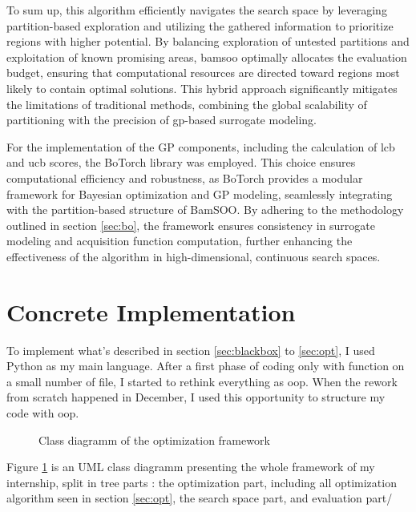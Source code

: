To sum up, this algorithm efficiently navigates the search space by leveraging partition-based exploration and utilizing the gathered information to prioritize regions with higher potential. By balancing exploration of untested partitions and exploitation of known promising areas, \acrshort{bamsoo} optimally allocates the evaluation budget, ensuring that computational resources are directed toward regions most likely to contain optimal solutions. This hybrid approach significantly mitigates the limitations of traditional methods, combining the global scalability of partitioning with the precision of \acrshort{gp}-based surrogate modeling.

For the implementation of the GP components, including the calculation of \acrshort{lcb} and \acrshort{ucb} scores, the BoTorch library was employed. This choice ensures computational efficiency and robustness, as BoTorch provides a modular framework for Bayesian optimization and GP modeling, seamlessly integrating with the partition-based structure of BamSOO. By adhering to the methodology outlined in section \ref{sec:bo}, the framework ensures consistency in surrogate modeling and acquisition function computation, further enhancing the effectiveness of the algorithm in high-dimensional, continuous search spaces.

\FloatBarrier

\section{Concrete Implementation}
\label{sec:concrete_impl}
To implement what's described in section \ref{sec:blackbox} to \ref{sec:opt}, I used Python as my main language. After a first phase of coding only with function on a small number of file, I started to rethink everything as \acrfull{oop}. When the rework from scratch happened in December, I used this opportunity to structure my code with \acrshort{oop}. 

\begin{figure}[h]
    \centering
    
    \caption{Class diagramm of the optimization framework}
    \label{fig:class_diag}
\end{figure}

Figure \ref{fig:class_diag} is an UML class diagramm presenting the whole framework of my internship, split in tree parts : the optimization part, including all optimization algorithm seen in section \ref{sec:opt}, the search space part, and evaluation part/


